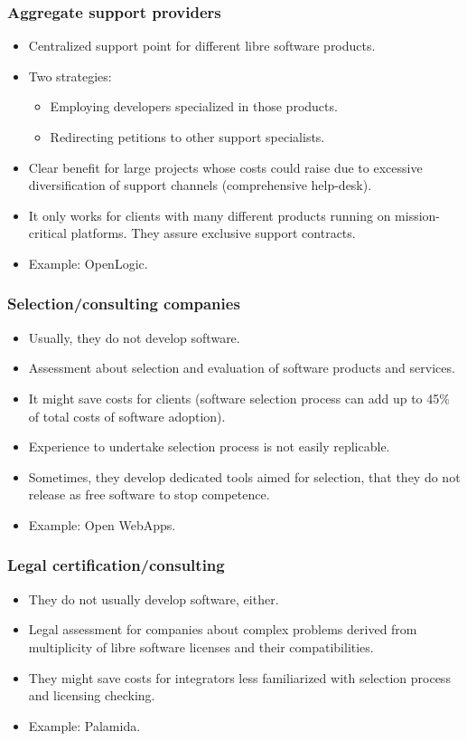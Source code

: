 \begin{frame}
 \frametitle{Aggregate support providers}
 \begin{itemize}
  \item Centralized support point for different libre software products.
  \item Two strategies:
  \begin{itemize}
   \item Employing developers specialized in those products.
   \item Redirecting petitions to other support specialists.
  \end{itemize}
  \item Clear benefit for large projects whose costs could raise due to excessive
diversification of support channels (comprehensive help-desk).
  \item It only works for clients with many different products running on mission-critical platforms.
  They assure exclusive support contracts.
  \item Example: OpenLogic.
 \end{itemize}
\end{frame}

\begin{frame}
 \frametitle{Selection/consulting companies}
 \begin{itemize}
  \item Usually, they do not develop software.
  \item Assessment about selection and evaluation of software products and services.
  \item It might save costs for clients (software selection process can add up to 45\% of
total costs of software adoption).
  \item Experience to undertake selection process is not easily replicable.
  \item Sometimes, they develop dedicated tools aimed for selection, that they do not release as
free software to stop competence.
  \item Example: Open WebApps.
 \end{itemize}
\end{frame}

\begin{frame}
 \frametitle{Legal certification/consulting}
 \begin{itemize}
  \item They do not usually develop software, either.
  \item Legal assessment for companies about complex problems derived from multiplicity of libre software
licenses and their compatibilities.
  \item They might save costs for integrators less familiarized with selection process and licensing checking.
  \item Example: Palamida.
 \end{itemize}
\end{frame}


